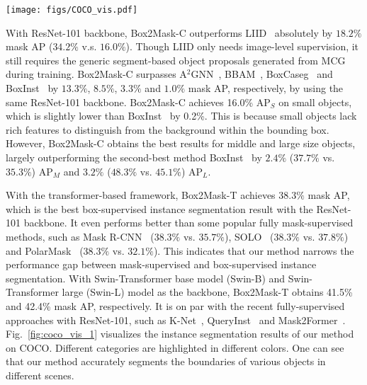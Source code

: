 \documentclass[12pt,onecolumn,letterpaper]{article}
\begin{document}
\begin{figure*}[t]
	\centering
	\texttt{[image: figs/COCO\_vis.pdf]}
	\caption{\textbf{Visualization of instance segmentation results} on COCO. The model is trained with only box annotations. Different colors encode different categories and instances. Best viewed on screen.}
	\label{fig:coco_vis_1}
\end{figure*}

With ResNet-101 backbone, Box2Mask-C outperforms  LIID~\cite{tpami2020leveraging} absolutely by $18.2\%$ mask AP ($34.2\%$ v.s. $16.0\%$). Though LIID only needs image-level supervision, it still requires the generic segment-based object proposals generated from MCG~\cite{tpmai2017mcg} during training. Box2Mask-C surpasses  A$^2$GNN~\cite{TPAMI2021affinity}, BBAM~\cite{cvpr2021bbam},  BoxCaseg~\cite{cvpr2021boxcaseg} and BoxInst~\cite{cvpr2021_boxinst} by $13.3\%$, $8.5\%$, $3.3\%$ and $1.0\%$ mask AP, respectively, by using the same ResNet-101 backbone. Box2Mask-C achieves 16.0\% AP$_S$ on small objects, which is slightly lower than BoxInst~\cite{cvpr2021_boxinst} by 0.2\%. This is because small objects lack rich features to distinguish from the background within the bounding box. However, Box2Mask-C obtains the best results for middle and large size objects, largely outperforming the second-best method BoxInst~\cite{cvpr2021_boxinst} by $2.4\%$ ($37.7\%$ vs. $35.3\%$) AP$_M$ and $3.2\%$ ($48.3\%$ vs. $45.1\%$) AP$_L$.

With the transformer-based framework, Box2Mask-T achieves $38.3\%$ mask AP, which is the best box-supervised instance segmentation result with the ResNet-101 backbone. It even performs better than some popular fully mask-supervised methods, such as Mask R-CNN~\cite{iccv2017maskrcnn} ($38.3\%$ vs. $35.7\%$),  SOLO~\cite{PMAI2021solo} ($38.3\%$ vs. $37.8\%$) and PolarMask~\cite{cvpr_2020polarmask} ($38.3\%$ vs. $32.1\%$). This indicates that our method narrows the performance gap between mask-supervised and box-supervised instance segmentation.
With Swin-Transformer base model (Swin-B) and Swin-Transformer large (Swin-L) model as the backbone, Box2Mask-T obtains 41.5\% and 42.4\% mask AP, respectively. It is on par with the recent fully-supervised approaches with ResNet-101, such as K-Net~\cite{nips2021knet},  QueryInst~\cite{ICCV2021_queryinst} and Mask2Former~\cite{cvpr2022mask2former}. 
Fig.~\ref{fig:coco_vis_1} visualizes the instance segmentation results of our method on COCO. 
Different categories are highlighted in different colors. One can see that our method accurately segments the boundaries of various objects in different scenes.
\end{document}
